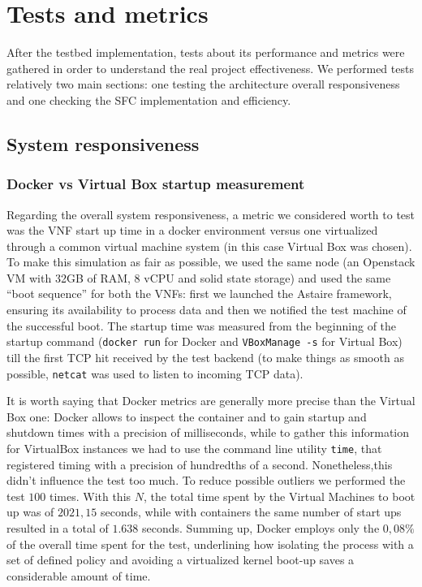 \chapter{Tests and metrics}

After the testbed implementation, tests about its performance and metrics were
gathered in order to understand the real project effectiveness. We performed
tests relatively two main sections: one testing the architecture overall
responsiveness and one checking the SFC implementation and efficiency.

\section{System responsiveness}

\subsection{Docker vs Virtual Box startup measurement}

Regarding the overall system responsiveness, a metric we considered worth to
test was the VNF start up time in a docker environment versus one virtualized
through a common virtual machine system (in this case Virtual Box was chosen).
To make this simulation as fair as possible, we used the same node (an 
Openstack VM with 32GB of RAM, 8 vCPU and solid state storage) and used the
same ``boot sequence'' for both the VNFs: first we launched the Astaire
framework, ensuring its availability to process data and then we notified the
test machine of the successful boot. The startup time was measured from the 
beginning of the startup command (\verb!docker run! for Docker and 
\verb!VBoxManage -s! for Virtual Box) till the first TCP hit received by the 
test backend (to make things as smooth as possible, \verb!netcat! was used 
to listen to incoming TCP data).

It is worth saying that Docker metrics are generally more precise than the
Virtual Box one: Docker allows to inspect the container and to gain startup and
shutdown times with a precision of milliseconds, while to gather this
information for VirtualBox instances we had to use the command line utility
\verb!time!, that registered timing with a precision of hundredths of a second.
Nonetheless,this didn't influence the test too much. To reduce possible
outliers we performed
the test $100$ times. With this $N$, the total time spent by the Virtual
Machines to boot up was of $2021,15$ seconds, while with containers the same
number of start ups resulted in a total of $1.638$ seconds. Summing up, Docker
employs only the $0,08\%$ of the overall time spent for the test, underlining
how isolating the process with a set of defined policy and avoiding a
virtualized kernel boot-up saves a considerable amount of time.

